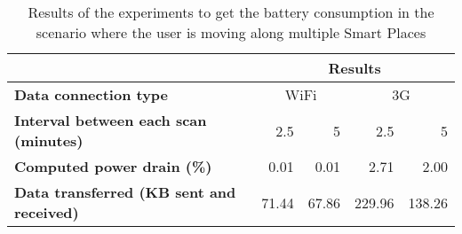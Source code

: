\begin{table}[]
\centering
\begin{tabular}{@{}|l|r|r|r|r|@{}}
\toprule
{\bf }                                        & \multicolumn{4}{c|}{{\bf Results}}                  \\ \midrule
{\bf Data connection type}                    & \multicolumn{2}{c|}{WiFi} & \multicolumn{2}{c|}{3G} \\ \midrule
{\bf Interval between each scan (minutes)}    & 2.5         & 5           & 2.5         & 5         \\ \midrule
{\bf Computed power drain (\%)}               & 0.01        & 0.01        & 2.71        & 2.00      \\ \midrule
{\bf Data transferred (KB sent and received)} & 71.44       & 67.86       & 229.96      & 138.26    \\ \bottomrule
\end{tabular}
\caption[Power drain when the user is moving]{Results of the experiments to get the battery consumption in the scenario where the user is moving along multiple Smart Places}
\label{tab:results_battery_walking}
\end{table}
